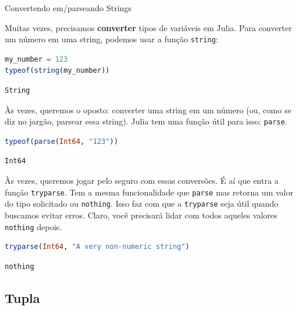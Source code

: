 \documentclass[
  notoc %
]{tufte-book}
\makeatletter
\newcommand{\passthrough}[1]{#1}
\renewcommand\subsubsection{%
\@startsection{subsubsection}{3}{\z@ }{-3.25ex\@plus -1ex \@minus -.2ex}{1.5ex \@plus .2ex}{\normalfont \normalsize \bfseries }
}
\makeatother
\begin{document}
\hypertarget{sec:string_conversions}{%
\subsubsection{Convertendo em/parseando
Strings}\label{sec:string_conversions}}

Muitas vezes, precisamos \textbf{converter} tipos de variáveis em Julia.
Para converter um número em uma string, podemos usar a função
\passthrough{\lstinline!string!}:

\begin{lstlisting}[language=Julia]
my_number = 123
typeof(string(my_number))
\end{lstlisting}

\begin{lstlisting}[language=Output]
String
\end{lstlisting}

Às vezes, queremos o oposto: converter uma string em um número (ou, como
se diz no jargão, parsear essa string). Julia tem uma função útil para
isso: \passthrough{\lstinline!parse!}.

\begin{lstlisting}[language=Julia]
typeof(parse(Int64, "123"))
\end{lstlisting}

\begin{lstlisting}[language=Output]
Int64
\end{lstlisting}

Às vezes, queremos jogar pelo seguro com essas conversões. É aí que
entra a função \passthrough{\lstinline!tryparse!}. Tem a mesma
funcionalidade que \passthrough{\lstinline!parse!} mas retorna um valor
do tipo solicitado ou \passthrough{\lstinline!nothing!}. Isso faz com
que a \passthrough{\lstinline!tryparse!} seja útil quando buscamos
evitar erros. Claro, você precisará lidar com todos aqueles valores
\passthrough{\lstinline!nothing!} depois.

\begin{lstlisting}[language=Julia]
tryparse(Int64, "A very non-numeric string")
\end{lstlisting}

\begin{lstlisting}[language=Output]
nothing
\end{lstlisting}

\hypertarget{sec:tuple}{%
\subsection{Tupla}\label{sec:tuple}}
\end{document}
